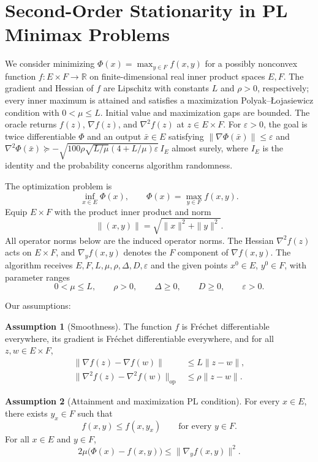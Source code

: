 \documentclass[10pt]{article}
\theoremstyle{definition}
\newtheorem{assumption}{Assumption}
\begin{document}
\section*{Second-Order Stationarity in PL Minimax Problems}
We consider minimizing $\Phi(x)=\max_{y\in F}f(x,y)$ for a possibly nonconvex function $f:E\times F\to\mathbb{R}$ on finite-dimensional real inner product spaces $E,F$. The gradient and Hessian of $f$ are Lipschitz with constants $L$ and $\rho>0$, respectively; every inner maximum is attained and satisfies a maximization Polyak--\L{}ojasiewicz condition with $0<\mu\leq L$. Initial value and maximization gaps are bounded. The oracle returns $f(z)$, $\nabla f(z)$, and $\nabla^2f(z)$ at $z\in E\times F$. For $\varepsilon>0$, the goal is twice differentiable $\Phi$ and an output $\bar{x}\in E$ satisfying $\|\nabla\Phi(\bar{x})\|\leq\varepsilon$ and $\nabla^2\Phi(\bar{x})\succeq-\sqrt{100\rho\sqrt{L/\mu}(4+L/\mu)\varepsilon}\,I_E$ almost surely, where $I_E$ is the identity and the probability concerns algorithm randomness.

The optimization problem is
\[
\inf_{x\in E}\Phi(x),
\qquad \Phi(x)=\max_{y\in F}f(x,y).
\]
Equip $E\times F$ with the product inner product and norm
\[
\|(x,y)\|=\sqrt{\|x\|^2+\|y\|^2}.
\]
All operator norms below are the induced operator norms. The Hessian $\nabla^2 f(z)$ acts on $E\times F$, and $\nabla_y f(x,y)$ denotes the $F$ component of $\nabla f(x,y)$. The algorithm receives $E,F,L,\mu,\rho,\Delta,D,\varepsilon$ and the given points $x^0\in E$, $y^0\in F$, with parameter ranges
\[
0<\mu\leq L,\qquad \rho>0,\qquad
\Delta\geq0,\qquad D\geq0,\qquad \varepsilon>0.
\]

Our assumptions:
\begin{assumption}[Smoothness]
The function $f$ is Fr\'echet differentiable everywhere, its gradient is Fr\'echet differentiable everywhere, and for all $z,w\in E\times F$,
\[
\begin{aligned}
\|\nabla f(z)-\nabla f(w)\|&\leq L\|z-w\|,\\
\|\nabla^2 f(z)-\nabla^2 f(w)\|_{\mathrm{op}}&\leq\rho\|z-w\|.
\end{aligned}
\]
\end{assumption}

\begin{assumption}[Attainment and maximization PL condition]
For every $x\in E$, there exists $y_x\in F$ such that
\[
f(x,y)\leq f(x,y_x)\qquad\text{for every }y\in F.
\]
For all $x\in E$ and $y\in F$,
\[
2\mu\bigl(\Phi(x)-f(x,y)\bigr)
\leq\|\nabla_y f(x,y)\|^2.
\]
\end{assumption}
\end{document}
